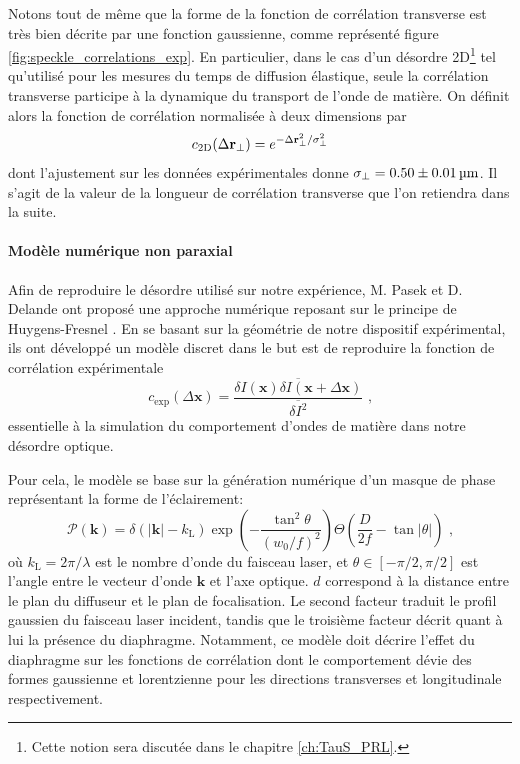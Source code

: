 Notons tout de même que la forme de la fonction de corrélation transverse est très bien décrite par une fonction gaussienne, comme représenté figure \ref{fig:speckle_correlations_exp}. En particulier, dans le cas d'un désordre 2D\footnote{Cette notion sera discutée dans le chapitre \ref{ch:TauS_PRL}.} tel qu'utilisé pour les mesures du temps de diffusion élastique, seule la corrélation transverse participe à la dynamique du transport de l'onde de matière. On définit alors la fonction de corrélation normalisée à deux dimensions par
\begin{equation}
c_{\mathrm{2D}}(\Delta \mathbf{r}_\perp)=e^{-\Delta \mathbf{r}^2_\perp / \sigma_{\perp}^2}
\label{eq:correlation_2D_normalisee}
\end{equation}
dont l'ajustement sur les données expérimentales donne $\sigma_{\perp}=0.50\pm\SI{0.01}{\micro\metre}$. Il s'agit de la valeur de la longueur de corrélation transverse que l'on retiendra dans la suite.



\paragraph*{Modèle numérique non paraxial}
Afin de reproduire le désordre utilisé sur notre expérience, M. Pasek et D. Delande ont proposé une approche numérique reposant sur le principe de Huygens-Fresnel \citep{volchkov2018measurement}. En se basant sur la géométrie de notre dispositif expérimental, ils ont développé un modèle discret dans le but est de reproduire la fonction de corrélation expérimentale
\begin{equation}
c_{\mathrm{exp}}(\Delta \mathbf{x})=\frac{\overline{\delta I(\mathbf{x}) \delta I(\mathbf{x} + \Delta \mathbf{x})}}{\overline{\delta I^2}} \text{ ,}
\label{eq:correlation_3D_normalisee}
\end{equation}
essentielle à la simulation du comportement d'ondes de matière dans notre désordre optique.

Pour cela, le modèle se base sur la génération numérique d'un masque de phase représentant la forme de l'éclairement:
\begin{equation}
\mathcal{P}(\mathbf{k})=\delta(\left| \mathbf{k} \right| - k_{\mathrm{L}}) \exp{\left( - \frac{\tan^2 \theta}{(w_0/f)^2} \right)} \Theta \left( \frac{D}{2f}-\tan{\left| \theta \right|} \right) \text{ ,}
\label{eq:speckle_masque_phase}
\end{equation}
où $k_{\mathrm{L}}=2\pi/\lambda$ est le nombre d'onde du faisceau laser, et $\theta\in\left[ -\pi/2, \pi/2 \right]$ est l'angle entre le vecteur d'onde $\mathbf{k}$ et l'axe optique. $d$ correspond à la distance entre le plan du diffuseur et le plan de focalisation. Le second facteur traduit le profil gaussien du faisceau laser incident, tandis que le troisième facteur décrit quant à lui la présence du diaphragme. Notamment, ce modèle doit décrire l'effet du diaphragme sur les fonctions de corrélation dont le comportement dévie des formes gaussienne et lorentzienne pour les directions transverses et longitudinale respectivement. 


